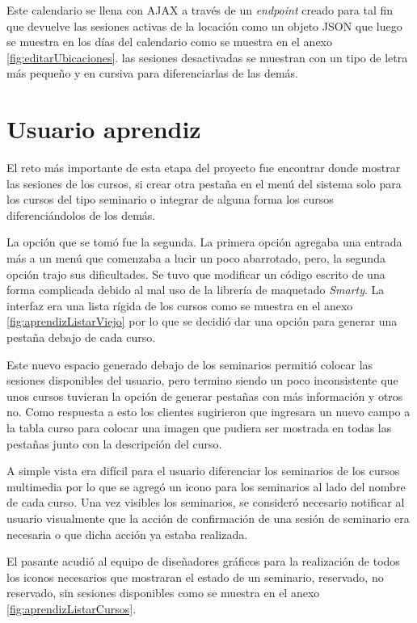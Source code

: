 	Este calendario se llena con \gls{AJAX} a través de un \emph{endpoint} creado para tal fin que devuelve las sesiones activas de la locación como un objeto \gls{JSON} que luego se muestra en los días del calendario como se muestra en el anexo \ref{fig:editarUbicaciones}. las sesiones desactivadas se muestran con un tipo de letra más pequeño y en cursiva para diferenciarlas de las demás.

	\section{Usuario aprendiz} %
	\label{sec:interfaz_para_el_usuario_aprendiz}
	
	El reto más importante de esta etapa del proyecto fue encontrar donde mostrar las sesiones de los cursos, si crear otra pestaña en el menú del sistema solo para los cursos del tipo seminario o integrar de alguna forma los cursos diferenciándolos de los demás.

	La opción que se tomó fue la segunda. La primera opción agregaba una entrada más a un menú que comenzaba a lucir un poco abarrotado, pero, la segunda opción trajo sus dificultades. Se tuvo que modificar un código escrito de una forma complicada debido al mal uso de la librería de maquetado \emph{Smarty}. La interfaz era una lista rígida de los cursos como se muestra en el anexo \ref{fig:aprendizListarViejo} por lo que se decidió dar una opción para generar una pestaña debajo de cada curso.

	Este nuevo espacio generado debajo de los seminarios permitió colocar las sesiones disponibles del usuario, pero termino siendo un poco inconsistente que unos cursos tuvieran la opción de generar pestañas con más información y otros no. Como respuesta a esto los clientes sugirieron que ingresara un nuevo campo a la tabla curso para colocar una imagen que pudiera ser mostrada en todas las pestañas junto con la descripción del curso.

	A simple vista era difícil para el usuario diferenciar los seminarios de los cursos multimedia por lo que se agregó un icono para los seminarios al lado del nombre de cada curso. Una vez visibles los seminarios, se consideró necesario notificar al usuario visualmente que la acción de confirmación de una sesión de seminario era necesaria o que dicha acción ya estaba realizada.

	El pasante acudió al equipo de diseñadores gráficos para la realización de todos los iconos necesarios que mostraran el estado de un seminario, reservado, no reservado, sin sesiones disponibles como se muestra en el anexo \ref{fig:aprendizListarCursos}.

